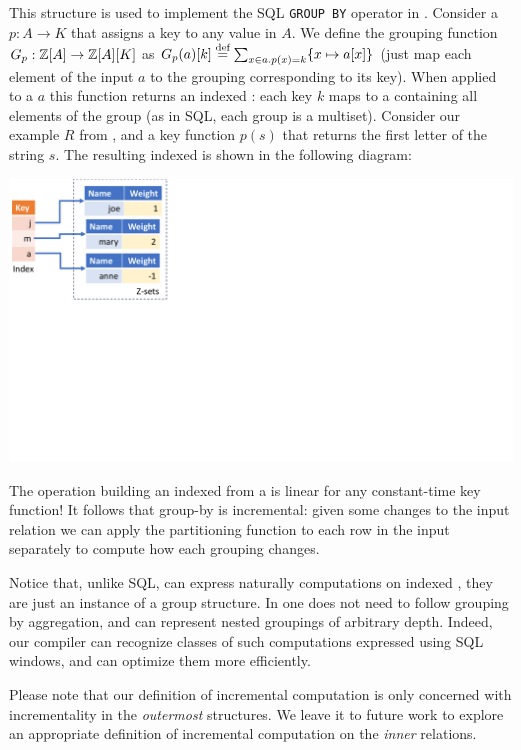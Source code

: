 This structure is used to implement the SQL \texttt{GROUP BY} operator
in \dbsp.  Consider a  $p: A \to K$
that assigns a key to any value in $A$.  We define the grouping
function $G_p: \mathbb{Z}[A] \to \mathbb{Z}[A][K]$ as $G_p(a)[k] \stackrel{\textrm{\scriptsize def}}{=} \sum_{x \in
  a.p(x)=k}\{ x \mapsto a[x] \}$ (just map each element of the input
$a$ to the \zr grouping corresponding to its key).  When applied to a
\zr $a$ this function returns an indexed \zr: each key $k$ maps to a
\zr containing all elements of the group (as in SQL, each group is a
multiset).  Consider our example \zr $R$ from ,
and a key function $p(s)$ that returns the first letter of the string
$s$.  The resulting indexed \zr is shown in the following diagram:

\begin{center}
  \includegraphics[trim={0 4.2in 7.5in 0},clip,scale=.34]{indexed.pdf}
\end{center}

The operation building an indexed \zr from a \zr is linear for any constant-time key
function!  It follows that group-by is incremental: given some changes
to the input relation we can apply the partitioning function to each
row in the input separately to compute how each grouping changes.

Notice that, unlike SQL, \dbsp can express naturally computations on
indexed \zrs, they are just an instance of a group structure.  In
\dbsp one does not need to follow grouping by aggregation, and \dbsp
can represent nested groupings of arbitrary depth.  Indeed, our
compiler can recognize classes of such computations expressed using
SQL windows, and can optimize them more efficiently.

Please note that our definition of incremental computation is only
concerned with incrementality in the \emph{outermost} structures.  We
leave it to future work to explore an appropriate definition of
incremental computation on the \emph{inner} relations.

